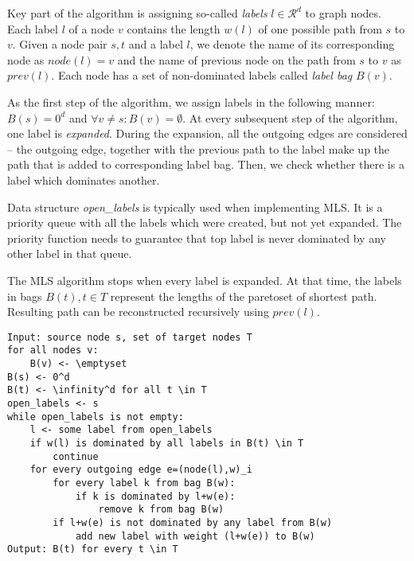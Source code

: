 Key part of the algorithm is assigning so-called \emph{labels} $l\in \mathcal{R}^d$ to graph nodes.
Each label $l$ of a node $v$ contains the length $w(l)$  of one possible path from $s$ to $v$. Given a node pair $s,t$ and a label $l$, we denote the name of its corresponding node as $node(l) = v$ and the name of previous node on the path from $s$ to $v$ as $prev(l)$.
Each node has a set of non-dominated labels called \emph{label bag} $B(v)$.

As the first step of the algorithm, we assign labels in the following manner: $B(s)=0^d$ and $\forall v \ne s: B(v)=\emptyset$.
At every subsequent step of the algorithm, one label is \emph{expanded}. 
During the expansion, all the outgoing edges are considered -- the outgoing edge, together with the previous path to the label make up the path that is added to corresponding label bag. Then, we check whether there is a label which dominates another.

Data structure {\em open\_labels} is typically used when implementing MLS. It is a priority queue with all the labels which were created, but not yet expanded. The priority function needs to guarantee that top label is never dominated by any other label in that queue.

The MLS algorithm stops when every label is expanded. At that time, the labels in bags $B(t), t \in T$ represent the lengths of the paretoset of shortest path. Resulting path can be reconstructed recursively using $prev(l)$.


\renewcommand{\lstlistingname}{Pseudocode} 
\begin{lstlisting}[caption={MLS Algorithm},label=MLSalg,captionpos=t,float,abovecaptionskip=-\medskipamount]
Input: source node s, set of target nodes T
for all nodes v:
	B(v) <- \emptyset
B(s) <- 0^d
B(t) <- \infinity^d for all t \in T
open_labels <- s
while open_labels is not empty:
	l <- some label from open_labels
    if w(l) is dominated by all labels in B(t) \in T
    	continue
    for every outgoing edge e=(node(l),w)_i
    	for every label k from bag B(w):
        	if k is dominated by l+w(e):
            	remove k from bag B(w)
        if l+w(e) is not dominated by any label from B(w)
        	add new label with weight (l+w(e)) to B(w)
Output: B(t) for every t \in T
\end{lstlisting}

